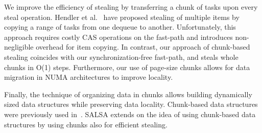 We improve the efficiency of stealing by transferring a chunk of tasks upon every steal
operation. Hendler et al.~\cite{Hendler:2002:NSW:571825.571876} have proposed stealing of multiple
items by copying a range of tasks from one dequeue to another. Unfortunately, this approach requires
costly CAS operations on the fast-path and introduces non-negligible overhead for item copying. In
contrast, our approach of chunk-based stealing coincides with our synchronization-free fast-path,
and steals whole chunks in O(1) steps. Furthermore, our use of page-size chunks allows for data
migration in NUMA architectures to improve locality.

Finally, the technique of organizing data in chunks allows building dynamically sized data
structures while preserving data locality. Chunk-based data structures were previously used
in~\cite{Braginsky:2011:LLL:1946143.1946153, Gidenstam:2010:CLQ:1940234.1940266,
Hendler:2006:DNW:1160290.1160294, Sundell:2011:LAC:1989493.1989550}. SALSA extends on the idea of
using chunk-based data structures by using chunks also for efficient stealing.